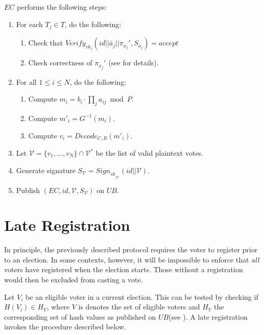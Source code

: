 \documentclass[bibtotoc,halfparskip,oneside]{scrreprt}
\newcommand{\eid}{\mathit{id}\xspace}
\newcommand{\sk}[1]{\mathit{sk}_{#1}\xspace}
\newcommand{\vk}[1]{\mathit{vk}_{#1}\xspace}
\newcommand{\SK}[1]{\sk{_#1}\xspace}
\newcommand{\EC}{\ensuremath{\mathit{EC}}\xspace}
\newcommand{\UB}{\ensuremath{\mathit{UB}}\xspace}
\newcommand{\Tallier}[1]{\ensuremath{\mathit{T}_{#1}}\xspace}
\newcommand{\Voter}[1]{\ensuremath{\mathit{V}_{#1}}\xspace}
\begin{document}
\EC performs the following steps:
\begin{enumerate}[resume]
	\item For each $\Tallier{j}\in T$, do the following:
	\begin{enumerate}
		\item Check that $\mathit{Verify}_{\vk{j}}(\eid||\bar{a}_j||\pi_{x_j}',S_{\bar{a}_j})=\mathit{accept}$
		\item Check correctness of $\pi_{x_j}'$ (see  for details).
	\end{enumerate}
	\item For all $1\leq i\leq N$, do the following:
	\begin{enumerate}
		\item Compute $m_i=b_i\cdot\prod_j a_{ij}\bmod{P}$.
		\item Compute $m'_i = G^{-1}(m_i)$.
		\item Compute $v_i = \mathit{Decode}_{C,R}(m'_i)$.
	\end{enumerate}
	\item Let $\mathcal{V}=\{v_1,\ldots,v_N\}\cap \mathcal{V}^*$ be the list of valid plaintext votes.
	\item Generate signature $S_{\mathcal{V}}=\mathit{Sign}_{\SK{\EC}}(\eid||\mathcal{V})$.
	\item Publish $(\EC,\eid,\mathcal{V},S_{\mathcal{V}})$ on \UB.
\end{enumerate}

\section{Late Registration}

In principle, the previously described protocol requires the voter to register prior to an election. In some contexts, however, it will be impossible to enforce that \emph{all} voters have registered when the election starts. Those without a registration would then be excluded from casting a vote.

Let $\Voter{i}$ be an eligible voter in a current election. This can be tested by checking if $H(\Voter{i})\in H_V$, where $V$ is denotes the set of eligible voters and $H_V$ the corresponding set of hash values as published on \UB (see ). A late registration invokes the procedure described below.
\end{document}
